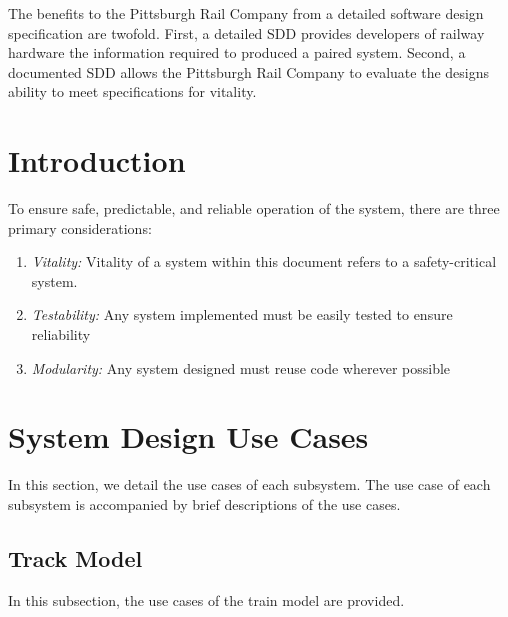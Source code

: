 \documentclass[]{article}
\begin{document}
The benefits to the Pittsburgh Rail Company from  a detailed software design specification are twofold. First, a detailed SDD provides developers of railway hardware the information required to produced a paired system. Second, a documented SDD allows the Pittsburgh Rail Company to evaluate the designs ability to meet specifications for vitality.

\section{Introduction}
To ensure safe, predictable, and reliable operation of the system, there are three primary considerations:
\begin{enumerate}
	\item \emph{Vitality:} Vitality of a system within this document refers to a safety-critical system.
	\item \emph{Testability:} Any system implemented must be easily tested to ensure reliability
	\item \emph{Modularity:} Any system designed must reuse code wherever possible
\end{enumerate}

\section{System Design Use Cases}
In this section, we detail the use cases of each subsystem. The use case of each subsystem is accompanied by brief descriptions of the use cases.

\subsection{Track Model}
In this subsection, the use cases of the train model are provided.
\end{document}
